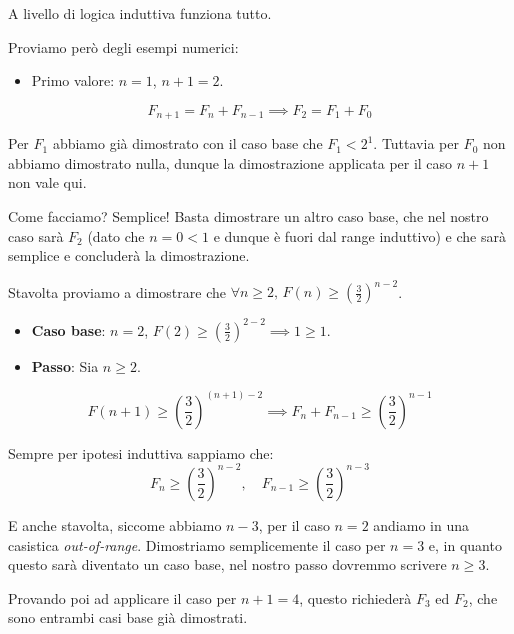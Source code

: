 \documentclass[12pt]{report}
\begin{document}
	A livello di logica induttiva funziona tutto.
	
	Proviamo però degli esempi numerici:
	\begin{itemize}
		\item Primo valore: $n=1$, $n+1=2$.
	\end{itemize}
	
	\[
	F_{n+1} = F_n + F_{n-1} \implies F_2 = F_1 + F_0
	\]
	
	Per $F_1$ abbiamo già dimostrato con il caso base che $F_1 < 2^1$.
	Tuttavia per $F_0$ non abbiamo dimostrato nulla, dunque la dimostrazione applicata per il caso $n+1$ non vale qui.
	
	Come facciamo? Semplice! Basta dimostrare un altro caso base, che nel nostro caso sarà $F_2$ (dato che $n=0 < 1$ e dunque è fuori dal range induttivo) e che sarà semplice e concluderà la dimostrazione.
	
	Stavolta proviamo a dimostrare che $\forall n \ge 2, \, F(n) \ge \left(\frac{3}{2}\right)^{n-2}$.
	
	\begin{itemize}
		\item \textbf{Caso base}: $n=2$, $F(2) \ge \left(\frac{3}{2}\right)^{2-2} \implies 1 \ge 1$.
		\item \textbf{Passo}: Sia $n \ge 2$.
	\end{itemize}
	
	\[
	F(n+1) \ge \left(\frac{3}{2}\right)^{(n+1)-2} \implies F_n + F_{n-1} \ge \left(\frac{3}{2}\right)^{n-1}
	\]
	
	Sempre per ipotesi induttiva sappiamo che:
	\[
	F_n \ge \left(\frac{3}{2}\right)^{n-2}, \quad F_{n-1} \ge \left(\frac{3}{2}\right)^{n-3}
	\]
	
	E anche stavolta, siccome abbiamo $n-3$, per il caso $n=2$ andiamo in una casistica \textit{out-of-range}.
	Dimostriamo semplicemente il caso per $n=3$ e, in quanto questo sarà diventato un caso base, nel nostro passo dovremmo scrivere $n \ge 3$.
	
	Provando poi ad applicare il caso per $n+1=4$, questo richiederà $F_3$ ed $F_2$, che sono entrambi casi base già dimostrati.
	
\end{document}
